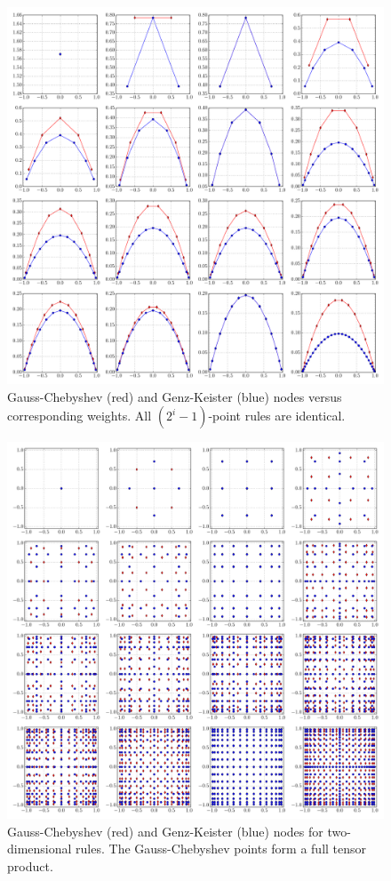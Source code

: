 \documentclass[a4paper,10pt]{article}
\begin{document}
\begin{figure}[h]
  \centering
  \includegraphics[width=\linewidth]{./img/gk_chebyshevu_nodes_1d.pdf}
  \caption{Gauss-Chebyshev (red) and Genz-Keister (blue) nodes versus
  corresponding weights. All $(2^i-1)$-point rules are identical.}
  \label{fig:gk_chebyshevu_nodes_1d}
\end{figure}

\begin{figure}[h]
  \centering
  \includegraphics[width=\linewidth]{./img/gk_chebyshevu_nodes_2d.pdf}
  \caption{Gauss-Chebyshev (red) and Genz-Keister (blue) nodes for
  two-dimensional rules. The Gauss-Chebyshev points form a full tensor
  product.}
  \label{fig:gk_chebyshevu_nodes_2d}
\end{figure}
\end{document}
